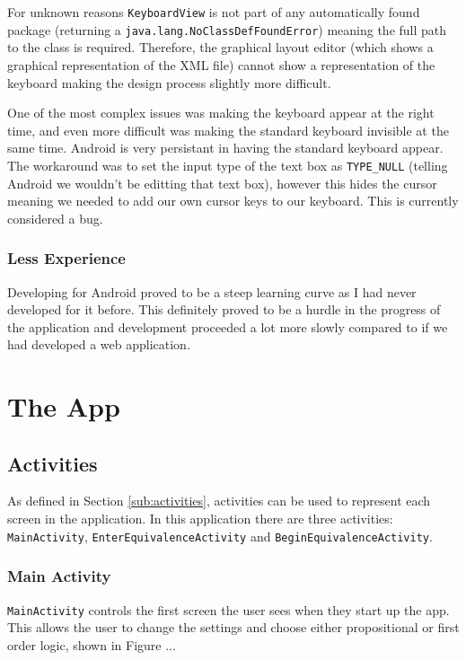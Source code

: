 \documentclass{report}
\begin{document}
For unknown reasons {\tt KeyboardView} is not part of any automatically found package (returning a {\tt java.lang.NoClassDefFoundError}) meaning the full path to the class is required. Therefore, the graphical layout editor (which shows a graphical representation of the XML file) cannot show a representation of the keyboard making the design process slightly more difficult.

One of the most complex issues was making the keyboard appear at the right time, and even more difficult was making the standard keyboard invisible at the same time. Android is very persistant in having the standard keyboard appear. The workaround was to set the input type of the text box as {\tt TYPE\_NULL} (telling Android we wouldn't be editting that text box), however this hides the cursor meaning we needed to add our own cursor keys to our keyboard. This is currently considered a bug.

\subsection{Less Experience}

Developing for Android proved to be a steep learning curve as I had never developed for it before. This definitely proved to be a hurdle in the progress of the application and development proceeded a lot more slowly compared to if we had developed a web application.

\chapter{The App}

\section{Activities}

As defined in Section \ref{sub:activities}, activities can be used to represent each screen in the application. In this application there are three activities: {\tt MainActivity}, {\tt EnterEquivalenceActivity} and {\tt BeginEquivalenceActivity}.

\subsection{Main Activity}

{\tt MainActivity} controls the first screen the user sees when they start up the app. This allows the user to change the settings and choose either propositional or first order logic, shown in Figure ...
\end{document}
